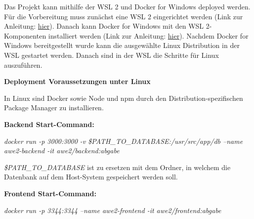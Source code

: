 Das Projekt kann mithilfe der WSL 2 und Docker for Windows deployed werden. Für die Vorbereitung muss zunächst eine WSL 2 eingerichtet werden (Link zur Anleitung: \href{https://docs.microsoft.com/en-us/windows/wsl/install-win10}{hier}). Danach kann Docker for Windows mit den WSL 2-Komponenten installiert werden (Link zur Anleitung: \href{https://docs.docker.com/docker-for-windows/wsl/}{hier}). Nachdem Docker for Windows bereitgestellt wurde kann die ausgewählte Linux Distribution in der WSL gestartet werden. Danach sind in der WSL die Schritte für Linux auszuführen.

\textbf{Deployment Voraussetzungen unter Linux}

In Linux sind Docker sowie Node und npm durch den Distribution-spezifischen Package Manager zu installieren.

\textbf{Backend Start-Command:}

\textit{docker run -p 3000:3000 -v \$PATH\_TO\_DATABASE:/usr/src/app/db --name awe2-backend -it awe2/backend:abgabe}

\textit{\$PATH\_TO\_DATABASE} ist zu ersetzen mit dem Ordner, in welchem die Datenbank auf dem Host-System gespeichert werden soll.

\textbf{Frontend Start-Command:}

\textit{docker run -p 3344:3344 --name awe2-frontend -it awe2/frontend:abgabe}